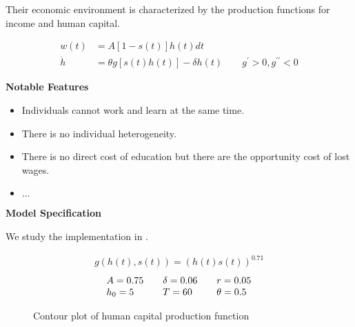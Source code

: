 \begin{frame}
Their economic environment is characterized by the production functions for income and human capital.

\begin{align*}
w(t)    & = A[1 - s(t)]h(t)dt \\
\dot{h} & = \theta g[s(t) h(t)] - \delta h(t) \qquad g^\prime > 0, g^{\prime\prime} < 0
\end{align*}

\end{frame}
\begin{frame}\textbf{Notable Features}\vspace{0.3cm}

\begin{itemize}\setlength\itemsep{1em}
\item Individuals cannot work and learn at the same time.
\item There is no individual heterogeneity.
\item There is no direct cost of education but there are the opportunity cost of lost wages.
\item $\hdots$
\end{itemize}

\end{frame}
\begin{frame}\textbf{Model Specification}\vspace{0.3cm}

We study the implementation in .

\begin{align*}
	g(h(t), s(t)) = \left(h(t) s(t)\right)^{0.71}
\end{align*}\vspace{-1.0cm}
\begin{align*}\begin{array}{l@{\qquad}l@{\qquad}l}
	A = 0.75 & \delta = 0.06 & r = 0.05\\
	h_0 = 5 & T = 60 & \theta = 0.5
\end{array}\end{align*}
\end{frame}


\begin{frame}\begin{figure}[htp]\centering
\caption{Contour plot of human capital production function}
\end{figure}\end{frame}

